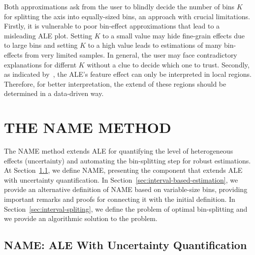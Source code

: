 \documentclass[twoside]{article}
\begin{document}
Both approximations ask from the user to blindly decide the number of
bins \(K\) for splitting the axis into equally-sized bins, an approach
with crucial limitations. Firstly, it is vulnerable to poor bin-effect
approximations that lead to a misleading ALE plot. Setting \(K\) to a
small value may hide fine-grain effects due to large bins and setting
\(K\) to a high value leads to estimations of many bin-effects from
very limited samples. In general, the user may face contradictory
explanations for differnt \(K\) without a clue to decide which one to
trust. Secondly, as indicated by~\citep{molnar2022}, the ALE's feature
effect can only be interpreted in local regions. Therefore, for better
interpretation, the extend of these regions should be determined
in a data-driven way.

\section{THE NAME METHOD}
\label{sec:NAME-method}

The NAME method extends ALE for quantifying the level of heterogeneous
effects (uncertainty) and automating the bin-splitting step for robust
estimations. At Section~\ref{sec:NAME-definition}, we define NAME,
presenting the component that extends ALE with uncertainty
quantification. In Section~\ref{sec:interval-based-estimation}, we
provide an alternative definition of NAME based on variable-size bins,
providing important remarks and proofs for connecting it with the
initial definition. In Section~\ref{sec:interval-spliting}, we define
the problem of optimal bin-splitting and we provide an algorithmic
solution to the problem. 

\subsection{NAME: ALE With Uncertainty Quantification}
\label{sec:NAME-definition}
\end{document}
